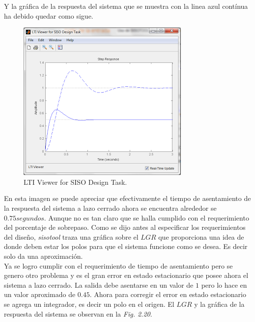 \documentclass[a4paper,12pt,twoside]{proyectotanquesecci}
\begin{document}
Y la gráfica de la respuesta del sistema que se muestra con la linea azul contínua ha debido quedar como sigue. \\

\begin{figure}[h]
\centering
\includegraphics[scale=0.6]{Ventana13}
\renewcommand{\figurename}{Fig.}
\caption{LTI Viewer for SISO Design Task.}
\label{LTI Viewer for SISO Design Task.}
\end{figure}

En esta imagen se puede apreciar que efectivamente  el tiempo de asentamiento de la respuesta del sistema a lazo cerrado ahora se encuentra alrededor se $0.75 segundos$. Aunque no es tan claro que se halla cumplido con el requerimiento del porcentaje de sobrepaso. Como se dijo antes al especificar los requerimientos del diseño, \textit{sisotool} traza una gráfica  sobre el $LGR$ que proporciona una idea de donde deben estar los polos para que el sistema funcione como se desea. Es decir solo da una aproximación. \\

Ya se logro cumplir con el requerimiento de tiempo de asentamiento pero se genero otro problema y es el gran error en estado estacionario que posee ahora el sistema a lazo cerrado. La salida debe asentarse en un valor de $1$ pero lo hace en un valor aproximado de $0.45$. Ahora para corregir el error en estado estacionario se agrega un integrador, es decir un polo en el origen. El $LGR$ y la gráfica de la respuesta del sistema se observan en la \textit{Fig. 2.20}. \\
\end{document}
